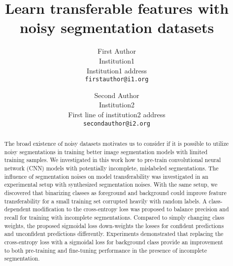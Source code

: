 \documentclass[10pt,twocolumn,letterpaper]{article}
\begin{document}
\onecolumn
{}


\twocolumn
{}
\newpage
\title{Learn transferable features with noisy segmentation datasets}

\author{First Author\\
Institution1\\
Institution1 address\\
{\tt\small firstauthor@i1.org}
\and
Second Author\\
Institution2\\
First line of institution2 address\\
{\tt\small secondauthor@i2.org}
}

\maketitle


\begin{abstract}


The broad existence of noisy datasets motivates us to consider if it is possible to utilize noisy segmentations in training better image segmentation models with limited training samples.
We investigated in this work how to pre-train convolutional neural network (CNN) models with potentially incomplete, mislabeled segmentations.
The influence of segmentation noises on model transferability was investigated in an experimental setup with synthesized segmentation noises.
With the same setup, we discovered that binarizing classes as foreground and background could improve feature transferability for a small training set corrupted heavily with random labels.
A class-dependent modification to the cross-entropy loss was proposed to balance precision and recall for training with incomplete segmentations.
Compared to simply changing class weights, the proposed sigmoidal loss down-weights the losses for confident predictions and unconfident predictions differently.
Experiments demonstrated that replacing the cross-entropy loss with a sigmoidal loss for background class provide an improvement to both pre-training and fine-tuning performance in the presence of incomplete segmentation.\end{abstract}

















{\small


}

\clearpage

\end{document}
